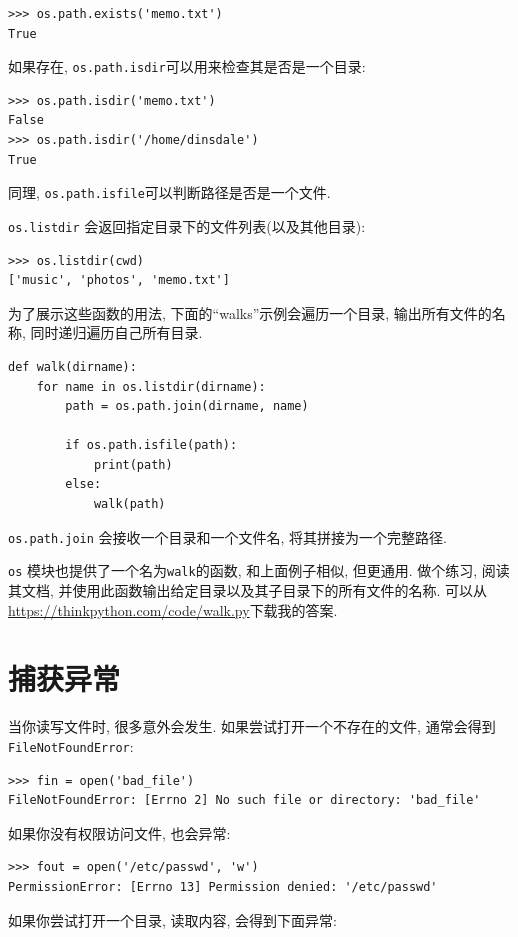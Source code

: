 \documentclass[10pt]{book}
\begin{document}
\begin{verbatim}
>>> os.path.exists('memo.txt')
True
\end{verbatim}
%
如果存在, {\tt os.path.isdir}可以用来检查其是否是一个目录:

\begin{verbatim}
>>> os.path.isdir('memo.txt')
False
>>> os.path.isdir('/home/dinsdale')
True
\end{verbatim}
%
同理, {\tt os.path.isfile}可以判断路径是否是一个文件. 

{\tt os.listdir} 会返回指定目录下的文件列表(以及其他目录):

\begin{verbatim}
>>> os.listdir(cwd)
['music', 'photos', 'memo.txt']
\end{verbatim}
%
为了展示这些函数的用法, 下面的``walks''示例会遍历一个目录, 
输出所有文件的名称, 同时递归遍历自己所有目录. 

\begin{verbatim}
def walk(dirname):
    for name in os.listdir(dirname):
        path = os.path.join(dirname, name)

        if os.path.isfile(path):
            print(path)
        else:
            walk(path)
\end{verbatim}
%

{\tt os.path.join} 会接收一个目录和一个文件名, 将其拼接为一个完整路径. 

{\tt os} 模块也提供了一个名为{\tt walk}的函数, 和上面例子相似, 但更通用. 
做个练习, 阅读其文档, 并使用此函数输出给定目录以及其子目录下的所有文件的名称. 
可以从\url{https://thinkpython.com/code/walk.py}下载我的答案. 


\section{捕获异常}
\label{catch}

当你读写文件时, 很多意外会发生. 
如果尝试打开一个不存在的文件, 通常会得到{\tt FileNotFoundError}:

\begin{verbatim}
>>> fin = open('bad_file')
FileNotFoundError: [Errno 2] No such file or directory: 'bad_file'

\end{verbatim}
%
如果你没有权限访问文件, 也会异常:

\begin{verbatim}
>>> fout = open('/etc/passwd', 'w')
PermissionError: [Errno 13] Permission denied: '/etc/passwd'
\end{verbatim}
%
如果你尝试打开一个目录, 读取内容, 会得到下面异常:
\end{document}
